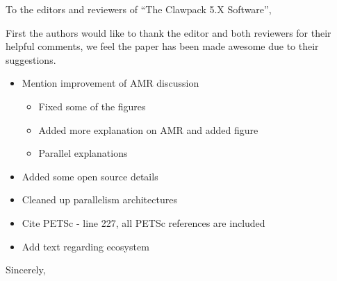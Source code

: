 \documentclass{letter}
\begin{document}
\address{Clawpack Developers}
\signature{Kyle T. Mandli, \\
           Aron J. Ahmadia, \\
           Donna Calhoun, \\
           David George, \\
           Yiannis Hadjimichael, \\ 
           David I. Ketcheson, \\
           Grady I. Lemoine, and \\
           Randall J. LeVeque}

\begin{letter}
{
}

\opening{To the editors and reviewers of ``The Clawpack 5.X Software'',}

First the authors would like to thank the editor and both reviewers for their
helpful comments, we feel the paper has been made awesome due to their
suggestions.

\begin{itemize}
    \item Mention improvement of AMR discussion
    \begin{itemize}
        \item Fixed some of the figures
        \item Added more explanation on AMR and added figure
        \item Parallel explanations
    \end{itemize}
    \item Added some open source details
    \item Cleaned up parallelism architectures
    \item Cite PETSc - line 227, all PETSc references are included
    \item Add text regarding ecosystem
\end{itemize}

\vspace{4cm}

\closing{Sincerely,}

\end{letter}
\end{document}
